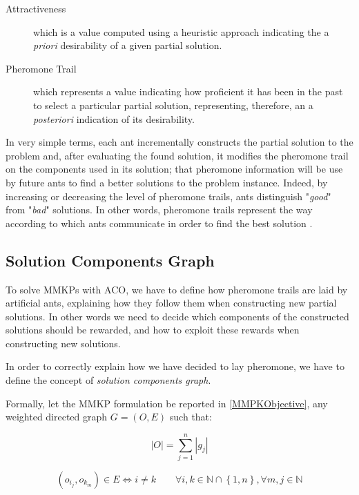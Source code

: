 \documentclass[12pt,a4paper]{report}
\newcommand{\N}{\mathbb{N}}
\begin{document}
\begin{description}
	\item[Attractiveness] which is a value computed using a heuristic approach indicating the a \textit{priori} desirability of a given partial solution.
	
	\item[Pheromone Trail] which represents a value indicating how proficient it has been in the past to select a particular partial solution, representing, therefore, an a \textit{posteriori} indication of its desirability.
\end{description} 

In very simple terms, each ant incrementally constructs the partial solution to the problem and, after evaluating the found solution, it modifies the pheromone trail on the components used in its solution; that pheromone information will be use by future ants to find a better solutions to the problem instance. Indeed, by increasing or decreasing the level of pheromone trails, ants distinguish "\textit{good}" from "\textit{bad}" solutions. In other words, pheromone trails represent the way according to which ants communicate in order to find the best solution \citet{acogrosso}\cite{MAXMIN}.
 
\subsection{Solution Components Graph}

To solve MMKPs with ACO, we have to define how pheromone trails are laid by artificial ants, explaining how they follow them when constructing new partial solutions. In other words we need to decide which components of the constructed solutions should be rewarded, and how to exploit these rewards when constructing new solutions.

In order to correctly explain how we have decided to lay pheromone, we have to define the concept of \textit{solution components graph}.

Formally, let the MMKP formulation be reported in \ref{MMPKObjective}, any weighted directed graph $G=(O,E)$ such that:

\begin{equation}
	|O| = \sum_{j=1}^n |g_j|
\end{equation}

\begin{equation}
	(o_{i_j}, o_{k_m}) \in E \Leftrightarrow i \neq k \qquad \forall i,k \in \N \cap \left\{1,n\right\}, \forall m,j \in \N
\end{equation}
\end{document}
